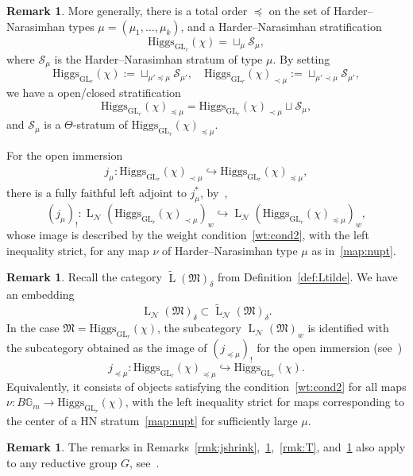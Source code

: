 \documentclass[11pt,oneside,a4paper,mathscr]{amsart}
\theoremstyle{definition}
\newtheorem{remark}[thm]{Remark}
\newcommand{\cS}{\mathcal{S}}
\newcommand{\LL}{\operatorname{L}}
\newcommand{\bgm}{B\mathbb{G}_m}
\newcommand{\GL}{\operatorname{GL}}
\newcommand{\Hig}{\mathrm{Higgs}}
\begin{document}
\begin{remark}\label{rmk:HN!}
More generally, 
there is a total order $\preceq$ on the set of Harder--Narasimhan types
$\mu=(\mu_1,\ldots,\mu_k)$, and a Harder--Narasimhan stratification
\[
  \Hig_{\GL_r}(\chi)=\sqcup_{\mu} \cS_{\mu},
\]
where $\cS_{\mu}$ is the Harder--Narasimhan stratum of type $\mu$.
By setting
\[
  \Hig_{\GL_r}(\chi):=\sqcup_{\mu'\preceq \mu}\cS_{\mu'},
   \quad
 \Hig_{\GL_r}(\chi)_{\prec \mu}:=\sqcup_{\mu'\prec \mu}\cS_{\mu'},
\]
we have a open/closed stratification
\[
    \Hig_{\GL_r}(\chi)_{\preceq \mu}=\Hig_{\GL_r}(\chi)_{\prec \mu} \sqcup \cS_{\mu},
\]
and $\cS_{\mu}$ is a $\Theta$-stratum of $\Hig_{\GL_r}(\chi)_{\preceq \mu}$.

For the open immersion
\begin{align}\label{open:ju}
   j_{\mu}\colon\Hig_{\GL_r}(\chi)_{\prec \mu}\hookrightarrow
  \Hig_{\GL_r}(\chi)_{\preceq \mu},
\end{align}
there is a fully faithful left adjoint to $j_{\mu}^{\ast}$,
by~\cite[Theorems~7.18 and~7.19]{PTlim},
\[
     (j_{\mu})_{!}\colon
     \LL_{\mathcal{N}}(\Hig_{\GL_r}(\chi)_{\prec \mu})_{w}
     \hookrightarrow
     \LL_{\mathcal{N}}(\Hig_{\GL_r}(\chi)_{\preceq \mu})_{w},
\]
whose image is described by the weight condition~\eqref{wt:cond2}, with the
left inequality strict, for any map $\nu$ of Harder--Narasimhan type $\mu$
as in~\eqref{map:nupt}.
\end{remark}



\begin{remark}\label{rmk:Ltilde2}
Recall the category $\widetilde{\LL}(\mathfrak{M})_{\delta}$ from
Definition~\ref{def:Ltilde}. We have an embedding
\[
    \LL_{\mathcal{N}}(\mathfrak{M})_{\delta}
    \subset
    \widetilde{\LL}_{\mathcal{N}}(\mathfrak{M})_{\delta}.
\]
In the case $\mathfrak{M}=\Hig_{\GL_r}(\chi)$, the subcategory
$\LL_{\mathcal{N}}(\mathfrak{M})_{w}$ is identified with the subcategory
obtained as the image of $(j_{\preceq \mu})_{!}$ for the open immersion (see~\cite[(8.65)]{PTlim})
\[
    j_{\preceq \mu}\colon
    \Hig_{\GL_r}(\chi)_{\preceq \mu}\hookrightarrow \Hig_{\GL_r}(\chi).
\]
Equivalently, it consists of objects satisfying the condition~\eqref{wt:cond2}
for all maps $\nu\colon \bgm \to \Hig_{\GL_r}(\chi)$, with the left inequality
strict for maps corresponding to the center of a HN stratum~\eqref{map:nupt} for sufficiently large $\mu$.
\end{remark}

\begin{remark}
    The remarks in Remarks~\ref{rmk:jshrink},~\ref{rmk:HN!},~\ref{rmk:T}, and~\ref{rmk:Ltilde2} also apply to any 
    reductive group $G$, see~\cite[Theorem~7.18 and 7.19]{PTlim}. 
\end{remark}
\end{document}
